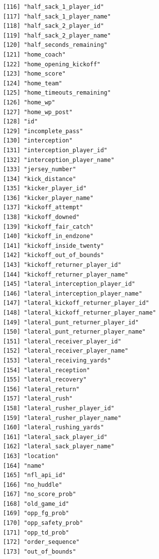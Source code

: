 \documentclass[
  letterpaper,
]{krantz}
\begin{document}
\begin{verbatim}
[116] "half_sack_1_player_id"               
[117] "half_sack_1_player_name"             
[118] "half_sack_2_player_id"               
[119] "half_sack_2_player_name"             
[120] "half_seconds_remaining"              
[121] "home_coach"                          
[122] "home_opening_kickoff"                
[123] "home_score"                          
[124] "home_team"                           
[125] "home_timeouts_remaining"             
[126] "home_wp"                             
[127] "home_wp_post"                        
[128] "id"                                  
[129] "incomplete_pass"                     
[130] "interception"                        
[131] "interception_player_id"              
[132] "interception_player_name"            
[133] "jersey_number"                       
[134] "kick_distance"                       
[135] "kicker_player_id"                    
[136] "kicker_player_name"                  
[137] "kickoff_attempt"                     
[138] "kickoff_downed"                      
[139] "kickoff_fair_catch"                  
[140] "kickoff_in_endzone"                  
[141] "kickoff_inside_twenty"               
[142] "kickoff_out_of_bounds"               
[143] "kickoff_returner_player_id"          
[144] "kickoff_returner_player_name"        
[145] "lateral_interception_player_id"      
[146] "lateral_interception_player_name"    
[147] "lateral_kickoff_returner_player_id"  
[148] "lateral_kickoff_returner_player_name"
[149] "lateral_punt_returner_player_id"     
[150] "lateral_punt_returner_player_name"   
[151] "lateral_receiver_player_id"          
[152] "lateral_receiver_player_name"        
[153] "lateral_receiving_yards"             
[154] "lateral_reception"                   
[155] "lateral_recovery"                    
[156] "lateral_return"                      
[157] "lateral_rush"                        
[158] "lateral_rusher_player_id"            
[159] "lateral_rusher_player_name"          
[160] "lateral_rushing_yards"               
[161] "lateral_sack_player_id"              
[162] "lateral_sack_player_name"            
[163] "location"                            
[164] "name"                                
[165] "nfl_api_id"                          
[166] "no_huddle"                           
[167] "no_score_prob"                       
[168] "old_game_id"                         
[169] "opp_fg_prob"                         
[170] "opp_safety_prob"                     
[171] "opp_td_prob"                         
[172] "order_sequence"                      
[173] "out_of_bounds"                       

\end{verbatim}
\end{document}
